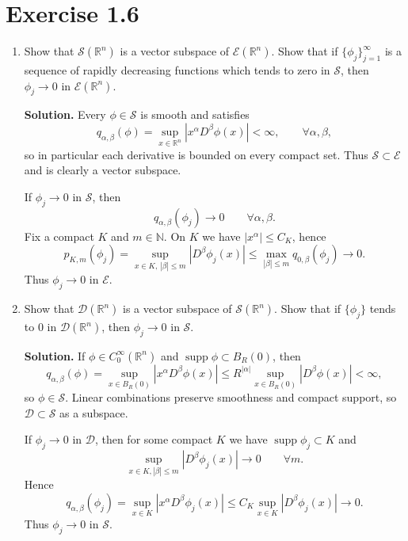 \documentclass[12pt,a4paper]{article}
\theoremstyle{plain}
\theoremstyle{definition}
\theoremstyle{remark}
\theoremstyle{remark}
\begin{document}
\section*{Exercise 1.6}

\begin{enumerate}
	
	\item[(a)]
	Show that $\mathcal{S}(\mathbb{R}^n)$ is a vector subspace of
	$\mathcal{E}(\mathbb{R}^n)$.  
	Show that if $\{\phi_j\}_{j=1}^\infty$ is a sequence of rapidly
	decreasing functions which tends to zero in $\mathcal{S}$, then
	$\phi_j \to 0$ in $\mathcal{E}(\mathbb{R}^n)$.
	
	\medskip
	\textbf{Solution.}
	Every $\phi\in\mathcal{S}$ is smooth and satisfies
	\[
	q_{\alpha,\beta}(\phi)
	= \sup_{x\in\mathbb{R}^n} |x^\alpha D^\beta\phi(x)| <\infty,
	\qquad \forall\alpha,\beta,
	\]
	so in particular each derivative is bounded on every compact set.
	Thus $\mathcal{S}\subset\mathcal{E}$ and is clearly a vector subspace.
	
	If $\phi_j\to 0$ in $\mathcal{S}$, then
	\[
	q_{\alpha,\beta}(\phi_j)\to 0
	\qquad\forall\alpha,\beta.
	\]
	Fix a compact $K$ and $m\in\mathbb{N}$.  On $K$ we have $|x^\alpha|\le C_K$,
	hence
	\[
	p_{K,m}(\phi_j)
	= \sup_{x\in K,\,|\beta|\le m} |D^\beta\phi_j(x)|
	\le \max_{|\beta|\le m} q_{0,\beta}(\phi_j)
	\to 0.
	\]
	Thus $\phi_j\to 0$ in $\mathcal{E}$.
	
	\item[(b)]
	Show that $\mathcal{D}(\mathbb{R}^n)$ is a vector subspace of
	$\mathcal{S}(\mathbb{R}^n)$.  Show that if $\{\phi_j\}$ tends to $0$ in
	$\mathcal{D}(\mathbb{R}^n)$, then $\phi_j\to 0$ in $\mathcal{S}$.
	
	\medskip
	\textbf{Solution.}
	If $\phi\in C_0^\infty(\mathbb{R}^n)$ and
	$\operatorname{supp}\phi\subset B_R(0)$, then
	\[
	q_{\alpha,\beta}(\phi)
	= \sup_{x\in B_R(0)} |x^\alpha D^\beta\phi(x)|
	\le R^{|\alpha|}
	\sup_{x\in B_R(0)}|D^\beta\phi(x)| <\infty,
	\]
	so $\phi\in\mathcal{S}$.  
	Linear combinations preserve smoothness and compact support, so
	$\mathcal{D}\subset\mathcal{S}$ as a subspace.
	
	If $\phi_j\to 0$ in $\mathcal{D}$, then for some compact $K$ we have
	$\operatorname{supp}\phi_j\subset K$ and
	\[
	\sup_{x\in K,|\beta|\le m}|D^\beta\phi_j(x)|\to 0
	\qquad\forall m.
	\]
	Hence
	\[
	q_{\alpha,\beta}(\phi_j)
	= \sup_{x\in K} |x^\alpha D^\beta\phi_j(x)|
	\le C_K \sup_{x\in K}|D^\beta\phi_j(x)|\to 0.
	\]
	Thus $\phi_j\to 0$ in $\mathcal{S}$.
	

\end{enumerate}
\end{document}
